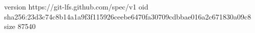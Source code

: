 version https://git-lfs.github.com/spec/v1
oid sha256:23d3c74c8b14a1a9f3f115926ceebe6470fa30709cdbbae016a2c671830a09c8
size 87540
